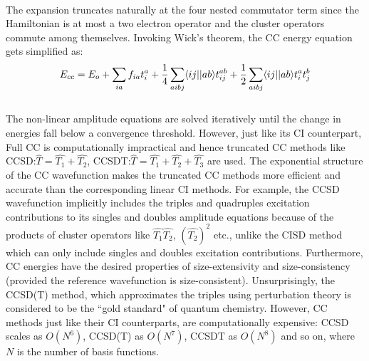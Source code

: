 \\
The expansion truncates naturally at the four nested commutator term since the Hamiltonian is at most a two 
electron operator and the cluster operators commute among themselves\cite{}.
Invoking Wick's theorem\cite{Wick50}, the CC energy equation gets simplified as:
\\
\begin{equation}
E_{cc} = E_o + \sum_{ia}f_{ia}t^a_i + \frac{1}{4}\sum_{aibj}\langle ij || ab \rangle t^{ab}_{ij} + \frac{1}{2}\sum_{aibj}\langle ij || ab \rangle t^a_it^b_j
\end{equation} 
\\
The non-linear amplitude equations are solved iteratively until the change in energies
fall below a convergence threshold. However, just like its CI counterpart, Full CC is 
computationally impractical and hence truncated CC methods like CCSD:\;$\hat{T} =
\hat{T_1} + \hat{T_2}$, CCSDT:\;$\hat{T} = \hat{T_1} + \hat{T_2} + \hat{T_3}$ 
are used. The exponential structure of the CC wavefunction makes the truncated CC methods 
more efficient and accurate than the corresponding linear CI methods. For example,
the CCSD wavefunction implicitly includes the triples and quadruples excitation contributions to 
its singles and doubles amplitude equations because of the products of cluster operators like 
$\hat{T_1}\hat{T_2}$, ${(\hat{T_2})}^2$ etc., unlike the CISD method which can only include 
singles and doubles excitation contributions. Furthermore, CC energies have the desired 
properties of size-extensivity and size-consistency (provided the reference wavefunction is
size-consistent). Unsurprisingly, the CCSD(T)\cite{Shen12} method, which approximates the triples using
perturbation theory is considered to be the ``gold standard" of quantum chemistry.
However, CC methods just like their CI counterparts, are computationally expensive: 
CCSD scales as $O(N^6)$, CCSD(T) as $O(N^7)$, CCSDT as $O(N^8)$ and so on, where $N$ 
is the number of basis functions.\\

